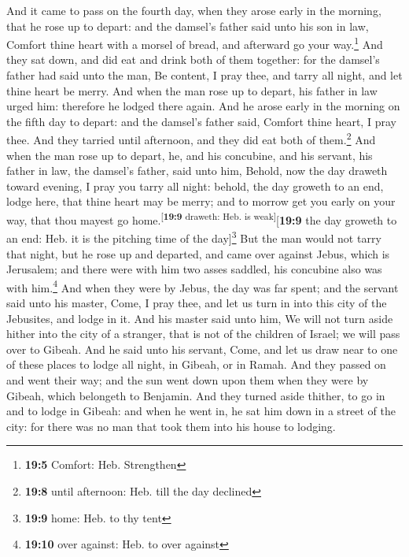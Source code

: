  And it came to pass on the fourth day, when they arose
early in the morning, that he rose up to depart: and the damsel's father
said unto his son in law, Comfort thine heart with a morsel of bread,
and afterward go your way.\footnote{\textbf{19:5} Comfort: Heb.
  Strengthen}  And they sat down, and did eat and drink
both of them together: for the damsel's father had said unto the man, Be
content, I pray thee, and tarry all night, and let thine heart be merry.
 And when the man rose up to depart, his father in law
urged him: therefore he lodged there again.  And he arose
early in the morning on the fifth day to depart: and the damsel's father
said, Comfort thine heart, I pray thee. And they tarried until
afternoon, and they did eat both of them.\footnote{\textbf{19:8} until
  afternoon: Heb. till the day declined}  And when the man
rose up to depart, he, and his concubine, and his servant, his father in
law, the damsel's father, said unto him, Behold, now the day draweth
toward evening, I pray you tarry all night: behold, the day groweth to
an end, lodge here, that thine heart may be merry; and to morrow get you
early on your way, that thou mayest go
home.\textsuperscript{{[}\textbf{19:9} draweth: Heb. is
weak{]}}{[}\textbf{19:9} the day groweth to an end: Heb. it is the
pitching time of the day{]}\footnote{\textbf{19:9} home: Heb. to thy
  tent}  But the man would not tarry that night, but he
rose up and departed, and came over against Jebus, which is Jerusalem;
and there were with him two asses saddled, his concubine also was with
him.\footnote{\textbf{19:10} over against: Heb. to over against}
 And when they were by Jebus, the day was far spent; and
the servant said unto his master, Come, I pray thee, and let us turn in
into this city of the Jebusites, and lodge in it.  And
his master said unto him, We will not turn aside hither into the city of
a stranger, that is not of the children of Israel; we will pass over to
Gibeah.  And he said unto his servant, Come, and let us
draw near to one of these places to lodge all night, in Gibeah, or in
Ramah.  And they passed on and went their way; and the
sun went down upon them when they were by Gibeah, which belongeth to
Benjamin.  And they turned aside thither, to go in and to
lodge in Gibeah: and when he went in, he sat him down in a street of the
city: for there was no man that took them into his house to lodging.

